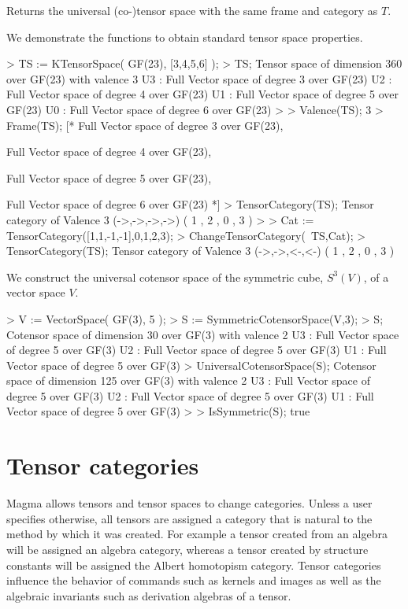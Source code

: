 Returns the universal (co-)tensor space with the same frame and category as $T$.

\begin{example}
We demonstrate the functions to obtain standard tensor space properties.

\begin{code}
> TS := KTensorSpace( GF(23), [3,4,5,6] );
> TS;
Tensor space of dimension 360 over GF(23) with valence 3
U3 : Full Vector space of degree 3 over GF(23)
U2 : Full Vector space of degree 4 over GF(23)
U1 : Full Vector space of degree 5 over GF(23)
U0 : Full Vector space of degree 6 over GF(23)
> 
> Valence(TS);
3
> Frame(TS);
[*
    Full Vector space of degree 3 over GF(23),

    Full Vector space of degree 4 over GF(23),

    Full Vector space of degree 5 over GF(23),

    Full Vector space of degree 6 over GF(23)
*]
> TensorCategory(TS);
Tensor category of Valence 3 (->,->,->,->) 
({ 1 },{ 2 },{ 0 },{ 3 })
> 
> Cat := TensorCategory([1,1,-1,-1],{{0},{1},{2},{3}});
> ChangeTensorCategory(~TS,Cat);
> TensorCategory(TS);
Tensor category of Valence 3 (->,->,<-,<-) 
({ 1 },{ 2 },{ 0 },{ 3 })
\end{code}

We construct the universal cotensor space of the symmetric cube, $S^3(V)$, of a vector space $V$.

\begin{code}
> V := VectorSpace( GF(3), 5 );
> S := SymmetricCotensorSpace(V,3);
> S;
Cotensor space of dimension 30 over GF(3) with valence 2
U3 : Full Vector space of degree 5 over GF(3)
U2 : Full Vector space of degree 5 over GF(3)
U1 : Full Vector space of degree 5 over GF(3)
> UniversalCotensorSpace(S);
Cotensor space of dimension 125 over GF(3) with valence 2
U3 : Full Vector space of degree 5 over GF(3)
U2 : Full Vector space of degree 5 over GF(3)
U1 : Full Vector space of degree 5 over GF(3)
> 
> IsSymmetric(S);
true
\end{code}
\end{example}

\chapter{Tensor categories}\label{ch:tensor-categories}

Magma allows tensors and tensor spaces to change categories. 
Unless a user specifies otherwise,
all tensors are assigned a category that is natural to the method
by which it was created.
For example a tensor created from an algebra will be assigned an 
algebra category, whereas a tensor created by structure constants
will be assigned the Albert homotopism category.  Tensor categories influence
the behavior of commands such as kernels and images  
as well as the algebraic invariants such as derivation algebras of a tensor.  

